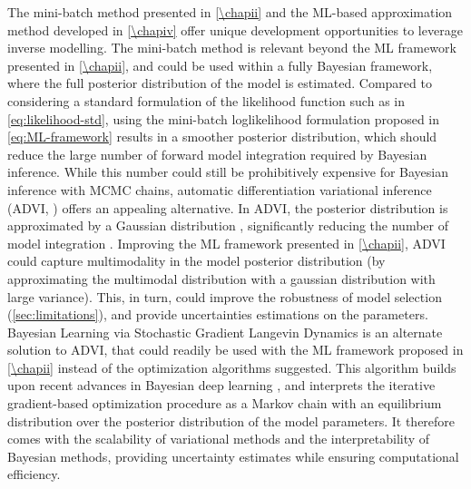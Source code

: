 The mini-batch method presented in \cref{\chapii} and the ML-based approximation method developed in \cref{\chapiv} offer unique development opportunities to leverage inverse modelling.
%
The mini-batch method is relevant beyond the ML framework presented in \cref{\chapii}, and could be used within a fully Bayesian framework, where the full posterior distribution of the model is estimated. Compared to considering a standard formulation of the likelihood function such as in \cref{eq:likelihood-std}, using the mini-batch loglikelihood formulation proposed in \cref{eq:ML-framework} results in a smoother posterior distribution, which should reduce the large number of forward model integration required by Bayesian inference.
% 
While this number could still be prohibitively expensive for Bayesian inference with MCMC chains, automatic differentiation variational inference (ADVI, \cite{Morningstar2020,Gosh2021}) offers an appealing alternative. In ADVI, the posterior distribution is approximated by a Gaussian distribution \citep{Morningstar2020}, significantly reducing the number of model integration \citep{Morningstar2020}. Improving the ML framework presented in \cref{\chapii}, ADVI could capture multimodality in the model posterior distribution (by approximating the multimodal distribution with a gaussian distribution with large variance). This, in turn, could improve the robustness of model selection (\cref{sec:limitations}), and provide uncertainties estimations on the parameters.
% 
Bayesian Learning via Stochastic Gradient Langevin Dynamics \citep{Welling2011BayesianLV} is an alternate solution to ADVI, that could readily be used with the ML framework proposed in \cref{\chapii} instead of the optimization algorithms suggested. This algorithm builds upon recent advances in Bayesian deep learning \citep{Wilson2020}, and interprets the iterative gradient-based optimization procedure as a Markov chain with an equilibrium distribution over the posterior distribution of the model parameters. It therefore comes with the scalability of variational methods and the interpretability of Bayesian methods, providing uncertainty estimates while ensuring computational efficiency.


